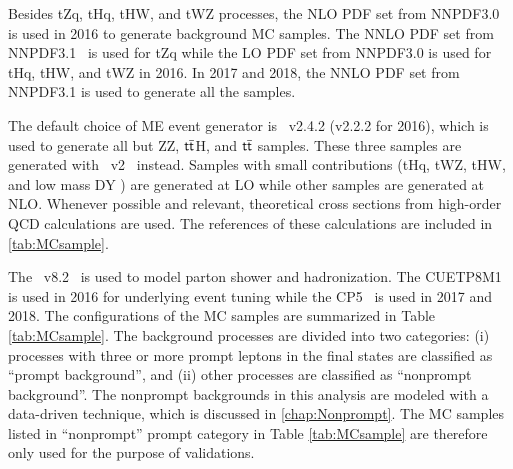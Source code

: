 Besides tZq, tHq, tHW, and tWZ processes, the \ac{NLO} \ac{PDF} set from NNPDF3.0~\cite{NNPDF:2014otw} is used in 2016 to generate background \ac{MC} samples. The \ac{NNLO} \ac{PDF} set from NNPDF3.1~\cite{NNPDF:2017mvq} is used for tZq while the \ac{LO} \ac{PDF} set from NNPDF3.0 is used for tHq, tHW, and tWZ in 2016. In 2017 and 2018, the \ac{NNLO} \ac{PDF} set from NNPDF3.1 is used to generate all the samples. 

The default choice of \ac{ME} event generator is \MG~v2.4.2 (v2.2.2 for 2016), which is used to generate all but ZZ, $\textsf{t}\overline{\textsf{t}}$H, and $\textsf{t}\overline{\textsf{t}}$ samples. These three samples are generated with \Pow~v2~\cite{Frixione:2007vw} instead. Samples with small contributions (tHq, tWZ, tHW, and low mass DY ) are generated at \ac{LO} while other samples are generated at \ac{NLO}. Whenever possible and relevant, theoretical cross sections from high-order \ac{QCD} calculations are used. The references of these calculations are included in \ref{tab:MCsample}.

The \PY~v8.2~\cite{Sjostrand:2014zea} is used to model parton shower and hadronization. The CUETP8M1~\cite{CMS:2015wcf} is used in 2016 for underlying event tuning while the CP5~\cite{CMS:2019csb} is used in 2017 and 2018. The configurations of the \ac{MC} samples are summarized in Table \ref{tab:MCsample}. The background processes are divided into two categories: (i) processes with three or more prompt leptons in the final states are classified as ``prompt background'', and (ii) other processes are classified as ``nonprompt background''. The nonprompt backgrounds in this analysis are modeled with a data-driven technique, which is discussed in \autoref{chap:Nonprompt}. The \ac{MC} samples listed in ``nonprompt'' prompt category in Table \ref{tab:MCsample} are therefore only used for the purpose of validations. 

